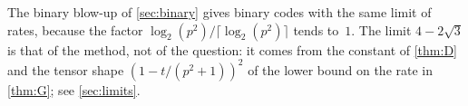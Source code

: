 The binary blow-up of \cref{sec:binary} gives binary codes with the same limit of rates, because the factor
$\log_2(p^2)/\lceil\log_2(p^2)\rceil$ tends to~$1$.
The limit $4-2\sqrt3$ is that of the method, not of the question: it comes from the constant of \cref{thm:D} and the
tensor shape $(1-t/(p^2+1))^2$ of the lower bound on the rate in \cref{thm:G}; see \cref{sec:limits}.
